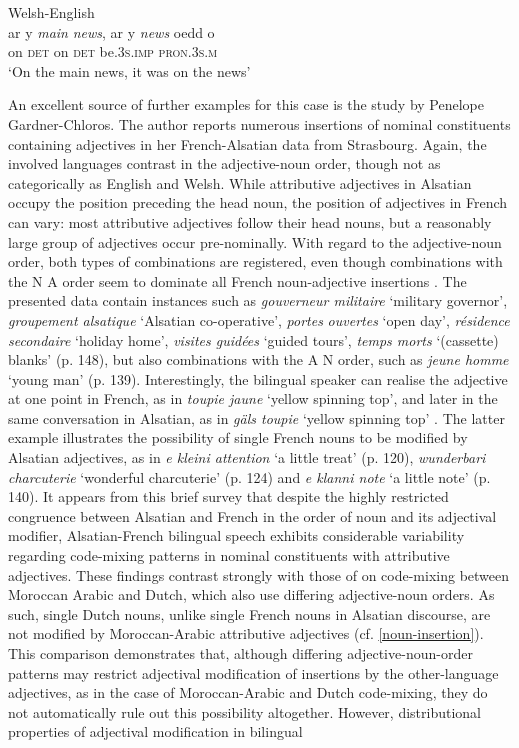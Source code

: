 \ea{\label{ex:4:7}}
Welsh-English \citep[261]{deuchar-congruence-2005}\\
\gll ar y \textit{main} \textit{news}, ar y \textit{news} oedd o\\
	on \textsc{det} {} {} on \textsc{det} {} be.\textsc{3s.imp} \textsc{pron.3s.m}\\
\glt `On the main news, it was on the news'
\z

An excellent source of further examples for this case is the \citeyear{gardner-chloros-1991} study by Penelope Gardner-Chloros. The author reports numerous insertions of nominal constituents containing adjectives in her French-Alsatian data from Strasbourg. Again, the involved languages contrast in the adjective-noun order, though not as categorically as English and Welsh. While attributive adjectives in Alsatian occupy the position preceding the head noun, the position of adjectives in French can vary: most attributive adjectives follow their head nouns, but a reasonably large group of adjectives occur pre-nominally. With regard to the adjective-noun order, both types of combinations are registered, even though combinations with the N A order seem to dominate all French noun-adjective insertions  \citep[cf.][141]{gardner-chloros-1991}. The presented data contain instances such as \textit{gouverneur militaire} `military governor', \textit{groupement alsatique} `Alsatian co-operative', \textit{portes} \textit{ouvertes} `open day', \textit{résidence secondaire} `holiday home', \textit{visites guidées} `guided tours', \textit{temps morts} `(cassette) blanks' (p. 148), but also combinations with the A N order, such as \textit{jeune homme} `young man' (p. 139). Interestingly, the bilingual speaker can realise the adjective at one point in French, as in \textit{toupie jaune} `yellow spinning top', and later in the same conversation in Alsatian, as in \textit{gäls toupie} `yellow spinning top' \citep[133]{gardner-chloros-1991}. The latter example illustrates the possibility of single French nouns to be modified by Alsatian adjectives, as in \textit{e kleini attention} `a little treat' (p. 120), \textit{wunderbari charcuterie} `wonderful charcuterie' (p. 124) and  \textit{e klanni note} `a little note' (p. 140). It appears from this brief survey that despite the highly restricted congruence between Alsatian and French in the order of noun and its adjectival modifier, Alsatian-French bilingual speech exhibits considerable variability regarding code-mixing patterns in nominal constituents with attributive adjectives. These findings contrast strongly with those of \citet{boumans-syntax-1998} on code-mixing between Moroccan Arabic and Dutch, which also use differing adjective-noun orders. As such, single Dutch nouns, unlike single French nouns in Alsatian discourse, are not modified by Moroccan-Arabic attributive adjectives (cf. \ref{noun-insertion}). This comparison demonstrates that, although differing adjective-noun-order patterns may restrict adjectival modification of insertions by the other-language adjectives, as in the case of Moroccan-Arabic and Dutch code-mixing, they do not automatically rule out this possibility altogether. However, distributional properties of adjectival modification in bilingual 
